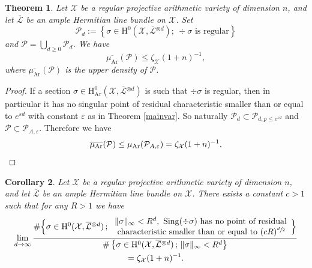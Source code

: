 \documentclass[JEP,XML,SOM,Unicode,published]{cedram}
\newcommand{\sep}{\,;\,}
\theoremstyle{plain}
\newtheorem{thm}{Theorem}[section]
\newtheorem{cor}[thm]{Corollary}
\theoremstyle{definition}
\newcommand{\ho}{\mathrm{H}}
\newcommand{\X}{\mathcal{X}}
\newcommand{\Li}{\overline{\mathcal{L}}{}}
\begin{document}
\begin{thm}\label{regular}
Let $\X$ be a regular projective arithmetic variety of dimension $n$, and let $\Li$ be an ample Hermitian line bundle on $\X$. Set
\[
\mathcal{P}_{d}:=\left\{ \sigma\in \ho^0(\X,\Li^{\otimes d});\
\div \sigma \text{ is regular} \right\}
\]
and $\mathcal{P}=\bigcup_{d\geq 0} \mathcal{P}_{d}$. We have
\[
\overline{\mu_{\mathrm{Ar}}}(\mathcal{P})\leq\zeta_{\X}(1+n)^{-1},
\]
where $\overline{\mu_{\mathrm{Ar}}}(\mathcal{P})$ is the upper density of $\mathcal{P}$.
\end{thm}
\begin{proof}[Proof]
If a section $ \sigma\in \ho_{\mathrm{Ar}}^0(\X,\Li^{\otimes d})$ is such that $\div \sigma$ is regular, then in particular it has no singular point of residual characteristic smaller than or equal to $e^{\varepsilon d}$ with constant $\varepsilon$ as in Theorem \ref{mainvar}. So naturally $\mathcal{P}_d\subset \mathcal{P}_{d, p\leq e^{\varepsilon d}}$ and $\mathcal{P}\subset \mathcal{P}_{A,\varepsilon}$. Therefore we have
\[
\overline{\mu_{\mathrm{Ar}}}(\mathcal{P})\leq \mu_{\mathrm{Ar}}(\mathcal{P}_{A,\varepsilon})=\zeta_{\X}(1+n)^{-1}.\qedhere
\]
\end{proof}

\begin{cor}\label{singR}
Let $\X$ be a regular projective arithmetic variety of dimension $n$, and let $\Li$ be an ample Hermitian line bundle on $\X$.
There exists a constant $c>1$ such that for any $R>1$ we have
\begin{multline*}
\lim_{d\to \infty}\frac{\#\Bigl\{ \sigma\in \ho^0(\X, \Li^{\otimes d})\sep \begin{array}{ll} \lVert \sigma \rVert_{\infty}<R^d,\ \mathrm{Sing}(\div \sigma) \text{ has no point of residual} \\ \text{ characteristic smaller than or equal to } (cR)^{\sfrac{d}{2}} \end{array}\Bigr\}}{\#\left\{ \sigma\in \ho^0(\X, \Li^{\otimes d})\sep \lVert \sigma \rVert_{\infty}<R^d \right\}}\\
=\zeta_{\X}(1+n)^{-1}.
\end{multline*}
\end{cor}
\end{document}
